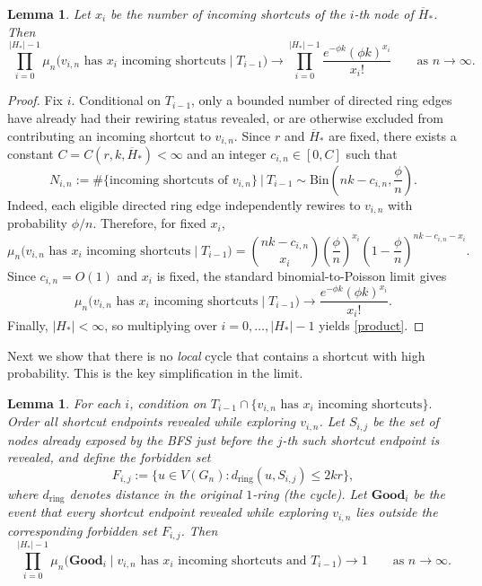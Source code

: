 \documentclass[10pt]{amsart}
\newtheorem{lemma}[theorem]{Lemma}
\begin{document}
\begin{lemma}\label{lm-degdist-WS}
Let $x_i$ be the number of incoming shortcuts of the $i$-th node of
$\overline{H}_*$. Then
\begin{equation}\label{product}
\prod_{i=0}^{|H_*|-1}
\mu_n\big(v_{i,n}\text{ has }x_i\text{ incoming shortcuts}\mid T_{i-1}\big)
\to
\prod_{i=0}^{|H_*|-1}\frac{e^{-\phi k}(\phi k)^{x_i}}{x_i!}
\qquad\text{as }n\to\infty.
\end{equation}
\end{lemma}

\begin{proof}
Fix $i$. Conditional on $T_{i-1}$, only a bounded number of directed ring edges
have already had their rewiring status revealed, or are otherwise excluded from
contributing an incoming shortcut to $v_{i,n}$. Since $r$ and $\overline{H}_*$
are fixed, there exists a constant $C=C(r,k,\overline{H}_*)<\infty$ and an
integer $c_{i,n}\in[0,C]$ such that
\[
N_{i,n}:=\#\{\text{incoming shortcuts of }v_{i,n}\}\ \Big|\ T_{i-1}
\sim \mathrm{Bin}\!\left(nk-c_{i,n},\frac{\phi}{n}\right).
\]
Indeed, each eligible directed ring edge independently rewires to $v_{i,n}$ with
probability $\phi/n$. Therefore, for fixed $x_i$,
\[
\mu_n\big(v_{i,n}\text{ has }x_i\text{ incoming shortcuts}\mid T_{i-1}\big)
=
\binom{nk-c_{i,n}}{x_i}
\left(\frac{\phi}{n}\right)^{x_i}
\left(1-\frac{\phi}{n}\right)^{nk-c_{i,n}-x_i}.
\]
Since $c_{i,n}=O(1)$ and $x_i$ is fixed, the standard binomial-to-Poisson limit
gives
\[
\mu_n\big(v_{i,n}\text{ has }x_i\text{ incoming shortcuts}\mid T_{i-1}\big)
\to
\frac{e^{-\phi k}(\phi k)^{x_i}}{x_i!}.
\]
Finally, $|H_*|<\infty$, so multiplying over $i=0,\dots,|H_*|-1$ yields
\eqref{product}.
\end{proof}

Next we show that there is no \textit{local} cycle that contains a shortcut with high probability. This is the key simplification in the limit.

\begin{lemma}\label{no cycle}
For each $i$, condition on
\(
T_{i-1}\cap\{v_{i,n}\text{ has }x_i\text{ incoming shortcuts}\}.
\)
Order all shortcut endpoints revealed while exploring $v_{i,n}$. Let $S_{i,j}$ be the set of nodes already
exposed by the BFS just before the $j$-th such shortcut endpoint is revealed,
and define the forbidden set
\[
F_{i,j}:=\{u\in V(G_n): d_{\mathrm{ring}}(u,S_{i,j})\le 2kr\},
\]
where $d_{\mathrm{ring}}$ denotes distance in the original $1$-ring (the cycle).
Let $\mathbf{Good}_i$ be the event that every shortcut endpoint revealed while
exploring $v_{i,n}$ lies outside the corresponding forbidden set $F_{i,j}$.
Then
\[
\prod_{i=0}^{|H_*|-1}
\mu_n\big(\mathbf{Good}_i\mid
v_{i,n}\text{ has }x_i\text{ incoming shortcuts and }T_{i-1}\big)
\to 1
\qquad\text{as }n\to\infty.
\]
\end{lemma}
\end{document}
